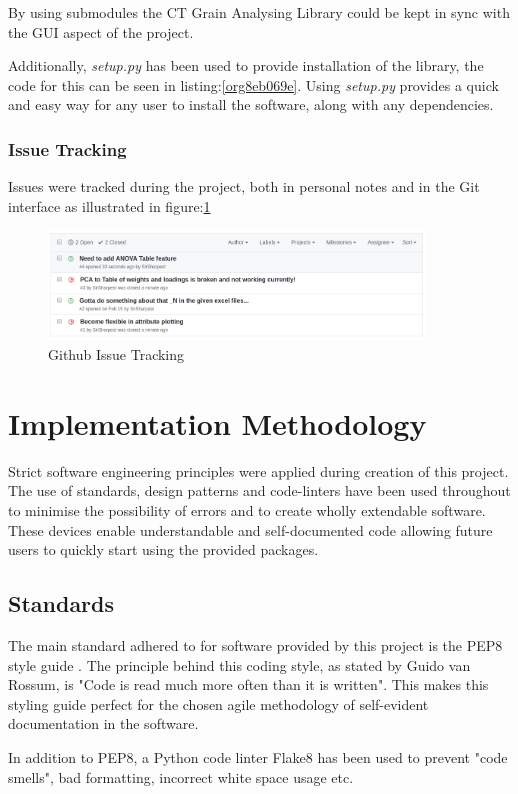 \documentclass[11pt]{report}
\begin{document}
By using submodules the CT Grain Analysing Library could be kept in sync with the GUI aspect of the project.

Additionally, \emph{setup.py} has been used to provide installation of the library, the code for this can be seen in listing:\ref{org8eb069e}. Using \emph{setup.py} provides a quick and easy way for any user to install the software, along with any dependencies.

\subsubsection{Issue Tracking}
\label{sec:orgcb79956}
Issues were tracked during the project, both in personal notes and in the Git interface as illustrated in figure:\ref{fig:org59d6f99}
\begin{figure}[htbp]
\centering
\includegraphics[width=10cm]{./images/github.png}
\caption{\label{fig:org59d6f99}
Github Issue Tracking}
\end{figure}

\section{Implementation Methodology}
\label{sec:org4458539}
Strict software engineering principles were applied during creation of this project. The use of standards, design patterns and code-linters have been used throughout to minimise the possibility of errors and to create wholly extendable software. These devices enable understandable and self-documented code allowing future users to quickly start using the provided packages.
\subsection{Standards}
\label{sec:org0955e27}
The main standard adhered to for software provided by this project is the PEP8 style guide \cite{VanRossum}. The principle behind this coding style, as stated by Guido van Rossum, is "Code is read much more often than it is written". This makes this styling guide perfect for the chosen agile methodology of self-evident documentation in the software.

In addition to PEP8, a Python code linter Flake8 has been used to prevent "code smells", bad formatting, incorrect white space usage etc.
\end{document}
